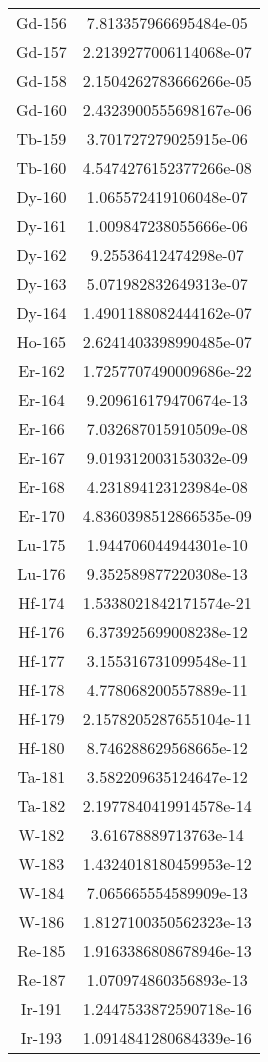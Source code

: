 \begin{table}[h!]
\begin{tabular}{|| c || c |}
Gd-156 & 7.813357966695484e-05 \\
Gd-157 & 2.2139277006114068e-07 \\
Gd-158 & 2.1504262783666266e-05 \\
Gd-160 & 2.4323900555698167e-06 \\
Tb-159 & 3.701727279025915e-06 \\
Tb-160 & 4.5474276152377266e-08 \\
Dy-160 & 1.065572419106048e-07 \\
Dy-161 & 1.009847238055666e-06 \\
Dy-162 & 9.25536412474298e-07 \\
Dy-163 & 5.071982832649313e-07 \\
Dy-164 & 1.4901188082444162e-07 \\
Ho-165 & 2.6241403398990485e-07 \\
Er-162 & 1.7257707490009686e-22 \\
Er-164 & 9.209616179470674e-13 \\
Er-166 & 7.032687015910509e-08 \\
Er-167 & 9.019312003153032e-09 \\
Er-168 & 4.231894123123984e-08 \\
Er-170 & 4.8360398512866535e-09 \\
Lu-175 & 1.944706044944301e-10 \\
Lu-176 & 9.352589877220308e-13 \\
Hf-174 & 1.5338021842171574e-21 \\
Hf-176 & 6.373925699008238e-12 \\
Hf-177 & 3.155316731099548e-11 \\
Hf-178 & 4.778068200557889e-11 \\
Hf-179 & 2.1578205287655104e-11 \\
Hf-180 & 8.746288629568665e-12 \\
Ta-181 & 3.582209635124647e-12 \\
Ta-182 & 2.1977840419914578e-14 \\
W-182 & 3.61678889713763e-14 \\
W-183 & 1.4324018180459953e-12 \\
W-184 & 7.065665554589909e-13 \\
W-186 & 1.8127100350562323e-13 \\
Re-185 & 1.9163386808678946e-13 \\
Re-187 & 1.070974860356893e-13 \\
Ir-191 & 1.2447533872590718e-16 \\
Ir-193 & 1.0914841280684339e-16 \\

\end{tabular}
\end{table}
